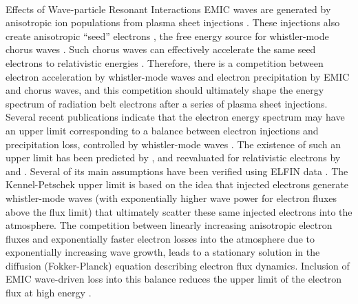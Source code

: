 \documentclass[
  letterpaper,
  DIV=11,
  numbers=noendperiod]{scrartcl}
\makeatletter
\let\oldparagraph\paragraph
\renewcommand{\paragraph}{
    \@ifstar
      \xxxParagraphStar
      \xxxParagraphNoStar
  }
\newcommand{\xxxParagraphStar}[1]{\oldparagraph*{#1}\mbox{}}
\newcommand{\xxxParagraphNoStar}[1]{\oldparagraph{#1}\mbox{}}
\makeatother
\begin{document}
\paragraph{Effects of Wave-particle Resonant Interactions}\label{effects-of-wave-particle-resonant-interactions}
EMIC waves are generated by anisotropic ion populations from plasma sheet injections \citep{Jun19:emic}. These injections also create anisotropic ``seed'' electrons \citep{Miyoshi13,Jaynes15:seedelectrons}, the free energy source for whistler-mode chorus waves \citep{Tao11,Fu14:radiation_belts,Zhang18:whistlers&injections}. Such chorus waves can effectively accelerate the same seed electrons to relativistic energies \citep{miyoshiRebuildingProcessOuter2003, thorneRapidLocalAcceleration2013, mourenasApproximateAnalyticalSolutions2014, allisonLocalHeatingRadiation2020}. Therefore, there is a competition between electron acceleration by whistler-mode waves \citep[supported by direct adiabatic heating during injections, see, e.g.][]{sorathiaModelingDepletionRecovery2018} and electron precipitation by EMIC and chorus waves, and this competition should ultimately shape the energy spectrum of radiation belt electrons after a series of plasma sheet injections. Several recent publications indicate that the electron energy spectrum may have an upper limit corresponding to a balance between electron injections and precipitation loss, controlled by whistler-mode waves \citep{oliferTaleTwoRadiation2021, oliferNaturalLimitSpectral2022}. The existence of such an upper limit has been predicted by \citet{kennelLimitStablyTrapped1966}, and reevaluated for relativistic electrons by \citet{summersLimitStablyTrapped2009} and \citet{summersLimitingEnergySpectrum2014}. Several of its main assumptions have been verified using ELFIN data \citep{mourenasCheckingKeyAssumptions2024}. The Kennel-Petschek upper limit is based on the idea that injected electrons generate whistler-mode waves (with exponentially higher wave power for electron fluxes above the flux limit) that ultimately scatter these same injected electrons into the atmosphere. The competition between linearly increasing anisotropic electron fluxes and exponentially faster electron losses into the atmosphere due to exponentially increasing wave growth, leads to a stationary solution in the diffusion (Fokker-Planck) equation describing electron flux dynamics. Inclusion of EMIC wave-driven loss into this balance reduces the upper limit of the electron flux at high energy \citep{mourenasExtremeEnergySpectra2022}.
\end{document}
